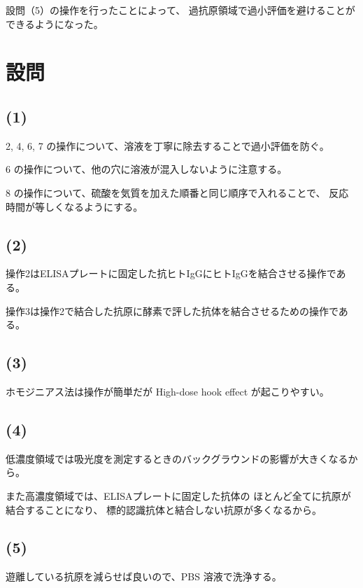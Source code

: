 \documentclass[a4paper]{ltjsarticle}
\begin{document}
設問（5）の操作を行ったことによって、
過抗原領域で過小評価を避けることができるようになった。

%
\section{設問}

\subsection{(1)}

2, 4, 6, 7 の操作について、溶液を丁寧に除去することで過小評価を防ぐ。

6 の操作について、他の穴に溶液が混入しないように注意する。

8 の操作について、硫酸を気質を加えた順番と同じ順序で入れることで、
反応時間が等しくなるようにする。


\subsection{(2)}

操作2はELISAプレートに固定した抗ヒトIgGにヒトIgGを結合させる操作である。

操作3は操作2で結合した抗原に酵素で評した抗体を結合させるための操作である。

\subsection{(3)}

ホモジニアス法は操作が簡単だが High-dose hook effect が起こりやすい。

\subsection{(4)}

低濃度領域では吸光度を測定するときのバックグラウンドの影響が大きくなるから。

また高濃度領域では、ELISAプレートに固定した抗体の
ほとんど全てに抗原が結合することになり、
標的認識抗体と結合しない抗原が多くなるから。

\subsection{(5)}

遊離している抗原を減らせば良いので、PBS 溶液で洗浄する。

\end{document}
